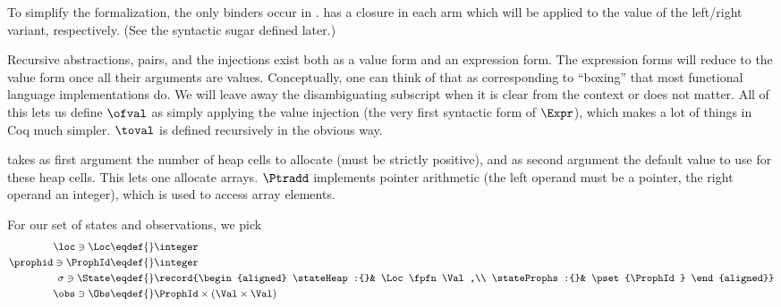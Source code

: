 To simplify the formalization, the only binders occur in .
 has a closure in each arm which will be applied to the value of the left/right variant, respectively.
(See the syntactic sugar defined later.)

Recursive abstractions, pairs, and the injections exist both as a value form and an expression form.
The expression forms will reduce to the value form once all their arguments are values.
Conceptually, one can think of that as corresponding to ``boxing'' that most functional language implementations do.
We will leave away the disambiguating subscript when it is clear from the context or does not matter.
All of this lets us define $\ofval$ as simply applying the value injection (the very first syntactic form of $\Expr$), which makes a lot of things in Coq much simpler.
$\toval$ is defined recursively in the obvious way.

 takes as first argument the number of heap cells to allocate (must be strictly positive), and as second argument the default value to use for these heap cells.
This lets one allocate arrays.
$\Ptradd$ implements pointer arithmetic (the left operand must be a pointer, the right operand an integer), which is used to access array elements.

For our set of states and observations, we pick
\begin{align*}
  \loc \ni \Loc \eqdef{}& \integer \\
  \prophid \ni \ProphId \eqdef{}& \integer \\
  \sigma \ni \State \eqdef{}& \record{\begin{aligned}
                   \stateHeap:{}& \Loc \fpfn \Val,\\
                   \stateProphs:{}& \pset{\ProphId}
                 \end{aligned}} \\
  \obs \ni \Obs \eqdef{}& \ProphId \times (\Val \times \Val)
\end{align*}

